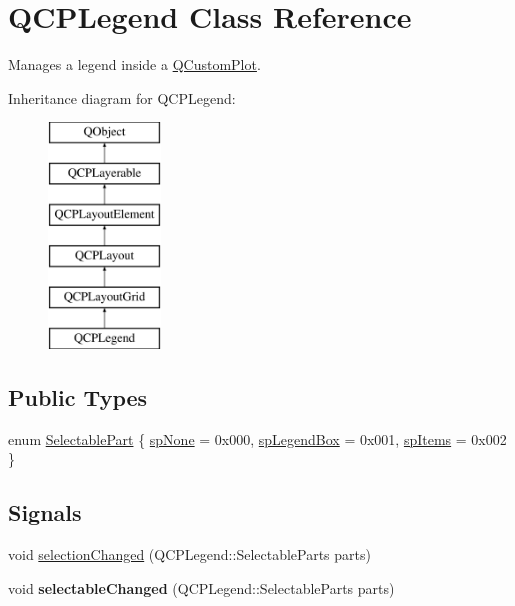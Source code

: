 \hypertarget{class_q_c_p_legend}{}\section{Q\+C\+P\+Legend Class Reference}
\label{class_q_c_p_legend}


Manages a legend inside a \mbox{\hyperlink{class_q_custom_plot}{Q\+Custom\+Plot}}.  


Inheritance diagram for Q\+C\+P\+Legend\+:\begin{figure}[H]
\begin{center}
\leavevmode
\includegraphics[height=6.000000cm]{class_q_c_p_legend}
\end{center}
\end{figure}
\subsection*{Public Types}
\begin{DoxyCompactItemize}
\item 
enum \mbox{\hyperlink{class_q_c_p_legend_a5404de8bc1e4a994ca4ae69e2c7072f1}{Selectable\+Part}} \{ \mbox{\hyperlink{class_q_c_p_legend_a5404de8bc1e4a994ca4ae69e2c7072f1a378201c07d500af7126e3ec91652eed7}{sp\+None}} = 0x000, 
\mbox{\hyperlink{class_q_c_p_legend_a5404de8bc1e4a994ca4ae69e2c7072f1a0fa4758962a46fa1dc9da818abae23c4}{sp\+Legend\+Box}} = 0x001, 
\mbox{\hyperlink{class_q_c_p_legend_a5404de8bc1e4a994ca4ae69e2c7072f1a768bfb95f323db4c66473375032c0af7}{sp\+Items}} = 0x002
 \}
\end{DoxyCompactItemize}
\subsection*{Signals}
\begin{DoxyCompactItemize}
\item 
void \mbox{\hyperlink{class_q_c_p_legend_a82c88464edac07a9eefaf3906268df3b}{selection\+Changed}} (Q\+C\+P\+Legend\+::\+Selectable\+Parts parts)
\item 
\mbox{\label{class_q_c_p_legend_a8a77300fd0976d6bdd8000f4e8d114b8}} 
void {\bfseries selectable\+Changed} (Q\+C\+P\+Legend\+::\+Selectable\+Parts parts)
\end{DoxyCompactItemize}
